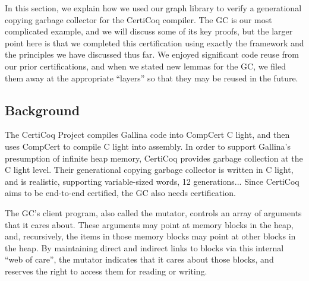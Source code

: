 {\color{magenta}In this section, we explain how we used our graph library
to verify a generational copying garbage collector for the 
CertiCoq compiler.} The GC is our most complicated example,
and we will discuss some of its key proofs, but the larger
point here is that we completed this certification using 
exactly the framework and the principles we have discussed
thus far. {\color{magenta}We enjoyed significant code 
reuse from our prior certifications, and when we stated 
new lemmas for the GC, we filed them away at the appropriate
``layers'' so that they may be reused in the future.}


\subsection{Background}
\label{sec:gcbackground}


The CertiCoq Project compiles Gallina code into CompCert 
C light, and then uses CompCert to compile C light
into assembly. In order to support Gallina's presumption of
infinite heap memory, CertiCoq provides garbage collection at
the C light level. Their generational copying garbage 
collector is written in C light, and is realistic, 
supporting variable-sized words, 12 generations... 
Since CertiCoq aims to be end-to-end certified, the GC 
also needs certification.

The GC's client program, also called the mutator, controls
an array of arguments that it cares about. 
These arguments may point at memory blocks 
in the heap, and, recursively, the items in those
memory blocks may point at other blocks in the heap. 
By maintaining direct and indirect links to
blocks via this internal ``web of care'', 
the mutator indicates that it 
cares about those blocks, and reserves the right to 
access them for reading or writing. 

